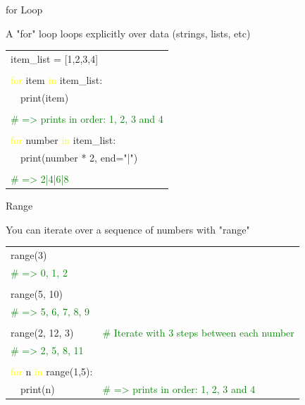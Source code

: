 \documentclass[serif, aspectratio=169]{beamer}
\newcommand{\tgreen}[1]{\textcolor{green}{#1}}
\newcommand{\tyellow}[1]{\textcolor{yellow}{#1}}
\newcommand{\tpurple}[1]{\textcolor{purple!50}{#1}}
\newenvironment{CLI} %
    {
    \noindent
    \ttfamily 
    \footnotesize
    \begin{tcolorbox}[colback=gray!150,colframe=black]
    \color{white}
    \begin{tabular}{p{4.5cm}p{7.5cm}}
    }
    { 
    \end{tabular}
    \end{tcolorbox}
    }
\begin{document}
\begin{frame}{for Loop}
    \begin{block}{A "for" loop loops explicitly over data (strings, lists, etc)}
        \vspace{2pt}
        \begin{CLI}
            item\_list = [1,2,3,4] & \\
            \pause
            & \\
            \tyellow{for} item \tyellow{in} item\_list: & \\
            ~~\tpurple{print}(item) & \\
            \pause
            & \\
            \multicolumn{2}{l}{\tgreen{\# => prints in order: 1, 2, 3 and 4}} \\
            \pause
            & \\
            \tyellow{for} number \tyellow{in} item\_list: & \\
            \multicolumn{2}{l}{~~\tpurple{print}(number * 2, end="|")} \\
            \pause
            & \\
            \multicolumn{2}{l}{\tgreen{\# => 2|4|6|8}} \\
        \end{CLI}
    \end{block}
\end{frame}

\begin{frame}{Range}
    \begin{block}{You can iterate over a sequence of numbers with "range"}
        \vspace{2pt}
        \begin{CLI}
            range(3) & \\
            \tgreen{\# => 0, 1, 2} & \\
            \pause
            & \\
            range(5, 10) & \\
            \tgreen{\# => 5, 6, 7, 8, 9} & \\
            \pause
            & \\
            range(2, 12, 3) & \tgreen{\# Iterate with 3 steps between each number} \\
            \tgreen{\# => 2, 5, 8, 11} & \\ 
            \pause
            & \\
            \tyellow{for} n \tyellow{in} range(1,5): & \\
            ~~\tpurple{print}(n) & \tgreen{\# => prints in order: 1, 2, 3 and 4} \\
        \end{CLI}
    \end{block}
\end{frame}
\end{document}
